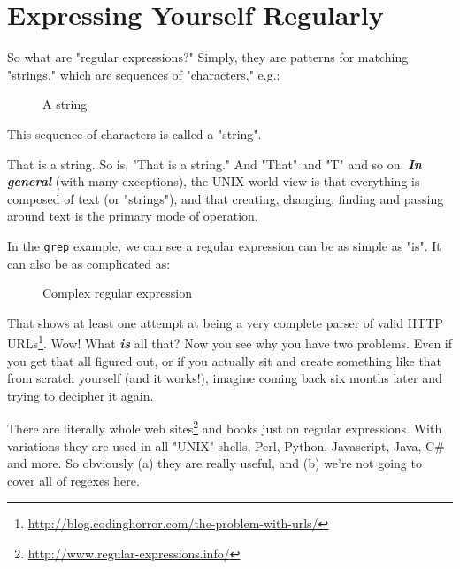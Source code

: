 \documentclass[10pt,american,]{book}
\newenvironment{Shaded}{\begin{snugshade}}{\end{snugshade}}
\newcommand{\KeywordTok}[1]{\textcolor[rgb]{0.13,0.29,0.53}{\textbf{{#1}}}}
\newcommand{\StringTok}[1]{\textcolor[rgb]{0.31,0.60,0.02}{{#1}}}
\newcommand{\NormalTok}[1]{{#1}}
\renewcommand{\href}[2]{#2\footnote{\url{#1}}}
\numberwithin{figure}{chapter}
\DeclareRobustCommand{\drcap}[1]{\begin{figure}[H]\caption{#1}\end{figure}}
\renewcommand{\KeywordTok}[1]{{#1}}
\renewcommand{\StringTok}[1]{{#1}}
\renewcommand{\NormalTok}[1]{{#1}}
\begin{document}
\section*{Expressing Yourself
Regularly}\label{expressing-yourself-regularly}

So what are "regular expressions?" Simply,
they are patterns for matching "strings," which are sequences of
"characters," e.g.:

\drcap{A string}

\begin{Shaded}
\begin{Highlighting}[]
\KeywordTok{This} \NormalTok{sequence of characters is called a }\StringTok{"string"}\NormalTok{.}
\end{Highlighting}
\end{Shaded}

That is a string. So is, "That is a string." And "That" and "T" and so
on. \textbf{\emph{In general}} (with many exceptions), the UNIX world
view is that everything is composed of text (or "strings"), and that
creating, changing, finding and passing around text is the primary mode
of operation.

In the \texttt{grep} example, we can see a regular expression can be as
simple as "is". It can also be as complicated as:

\drcap{Complex regular expression}

\begin{Shaded}
\begin{Highlighting}[]
\KeywordTok{(?bhttp}\NormalTok{://[-A-Za-z0-9+}\KeywordTok{&@}\NormalTok{#/%
\end{Highlighting}
\end{Shaded}

That shows at least one attempt at being
\href{http://blog.codinghorror.com/the-problem-with-urls/}{a very
complete parser of valid HTTP URLs}. Wow! What \textbf{\emph{is}} all
that? Now you see why you have two problems. Even if you get that all
figured out, or if you actually sit and create something like that from
scratch yourself (and it works!), imagine coming back six months later
and trying to decipher it again.

There are literally \href{http://www.regular-expressions.info/}{whole
web sites} and books just on regular expressions. With variations they
are used in all "UNIX" shells, Perl, Python, Javascript, Java, C\# and
more. So obviously (a) they are really useful, and (b) we're not going
to cover all of regexes here.
\end{document}
